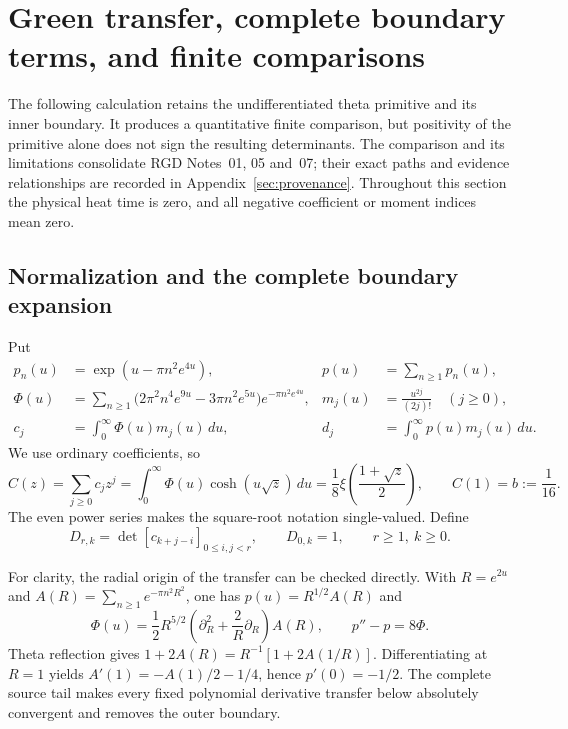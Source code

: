 \section{Green transfer, complete boundary terms, and finite comparisons}
\label{sec:green-comparison}

The following calculation retains the undifferentiated theta primitive and
its inner boundary.  It produces a quantitative finite comparison, but
positivity of the primitive alone does not sign the resulting determinants.
The comparison and its limitations consolidate RGD Notes~01, 05 and~07;
their exact paths and evidence relationships are recorded in
Appendix~\ref{sec:provenance}.  Throughout this section the physical heat
time is zero, and all negative coefficient or moment indices mean zero.

\subsection{Normalization and the complete boundary expansion}
Put
\begin{align}
 p_n(u)&=\exp(u-\pi n^2e^{4u}), & p(u)&=\sum_{n\ge1}p_n(u),\\
 \Phi(u)&=\sum_{n\ge1}\bigl(2\pi^2n^4e^{9u}-3\pi n^2e^{5u}\bigr)
                    e^{-\pi n^2e^{4u}}, &
 m_j(u)&=\frac{u^{2j}}{(2j)!}\quad(j\ge0),\\
 c_j&=\int_0^\infty\Phi(u)m_j(u)\,du, &
 d_j&=\int_0^\infty p(u)m_j(u)\,du.
\end{align}
We use ordinary coefficients, so
\begin{equation}
 C(z)=\sum_{j\ge0}c_jz^j
 =\int_0^\infty\Phi(u)\cosh(u\sqrt z)\,du
 =\frac18\xi\!\left(\frac{1+\sqrt z}{2}\right),
 \qquad C(1)=b:=\frac1{16}.
 \label{eq:green-C}
\end{equation}
The even power series makes the square-root notation single-valued.
Define
\begin{equation}
 D_{r,k}=\det[c_{k+j-i}]_{0\le i,j<r},\qquad
 D_{0,k}=1,\qquad r\ge1,\ k\ge0.
 \label{eq:green-D}
\end{equation}

For clarity, the radial origin of the transfer can be checked directly.
With \(R=e^{2u}\) and
\(A(R)=\sum_{n\ge1}e^{-\pi n^2R^2}\), one has
\(p(u)=R^{1/2}A(R)\) and
\begin{equation}
 \Phi(u)=\frac12R^{5/2}\left(\partial_R^2+\frac2R\partial_R\right)A(R),
 \qquad p''-p=8\Phi.
\end{equation}
Theta reflection gives
\(1+2A(R)=R^{-1}[1+2A(1/R)]\).  Differentiating at \(R=1\)
yields \(A'(1)=-A(1)/2-1/4\), hence \(p'(0)=-1/2\).
The complete source tail makes every fixed polynomial derivative transfer
below absolutely convergent and removes the outer boundary.

